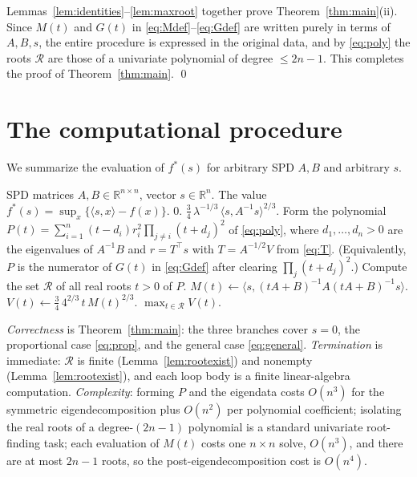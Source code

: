 \documentclass{amsart}
\theoremstyle{definition}
\begin{document}
Lemmas~\ref{lem:identities}--\ref{lem:maxroot} together prove Theorem~\ref{thm:main}(ii). Since $M(t)$ and $G(t)$ in \eqref{eq:Mdef}--\eqref{eq:Gdef} are written purely in terms of $A,B,s$, the entire procedure is expressed in the original data, and by \eqref{eq:poly} the roots $\mathcal R$ are those of a univariate polynomial of degree $\le 2n-1$. This completes the proof of Theorem~\ref{thm:main}. \qed

\section{The computational procedure}\label{sec:algorithm}

We summarize the evaluation of $f^*(s)$ for arbitrary SPD $A,B$ and arbitrary $s$.

\begin{algorithm}[h]
\caption{Evaluation of $f^*(s)$ for $f(x)=q_A(x)q_B(x)$}
\begin{algorithmic}[1]
\Require SPD matrices $A,B\in\mathbb{R}^{n\times n}$, vector $s\in\mathbb{R}^n$.
\Ensure The value $f^*(s)=\sup_x\{\langle s,x\rangle-f(x)\}$.
  \State \Return $0$.
\EndIf
{}
  \State \Return $\tfrac34\,\lambda^{-1/3}\,\langle s,A^{-1}s\rangle^{2/3}$.
\EndIf
\State Form the polynomial $P(t)=\sum_{i=1}^n (t-d_i)r_i^2\prod_{j\ne i}(t+d_j)^2$ of \eqref{eq:poly},
       where $d_1,\dots,d_n>0$ are the eigenvalues of $A^{-1}B$ and $r=T^\top s$ with $T=A^{-1/2}V$
       from \eqref{eq:T}. (Equivalently, $P$ is the numerator of $G(t)$ in \eqref{eq:Gdef} after clearing $\prod_j(t+d_j)^2$.)
\State Compute the set $\mathcal R$ of all real roots $t>0$ of $P$.
  \State $M(t)\gets \langle s,(tA+B)^{-1}A(tA+B)^{-1}s\rangle$.
  \State $V(t)\gets \tfrac34\,4^{2/3}\,t\,M(t)^{2/3}$.
\EndFor
\State \Return $\max_{t\in\mathcal R}V(t)$.
\end{algorithmic}
\end{algorithm}

\noindent\emph{Correctness} is Theorem~\ref{thm:main}: the three branches cover $s=0$, the proportional case \eqref{eq:prop}, and the general case \eqref{eq:general}. \emph{Termination} is immediate: $\mathcal R$ is finite (Lemma~\ref{lem:rootexist}) and nonempty (Lemma~\ref{lem:rootexist}), and each loop body is a finite linear-algebra computation. \emph{Complexity}: forming $P$ and the eigendata costs $O(n^3)$ for the symmetric eigendecomposition plus $O(n^2)$ per polynomial coefficient; isolating the real roots of a degree-$(2n-1)$ polynomial is a standard univariate root-finding task; each evaluation of $M(t)$ costs one $n\times n$ solve, $O(n^3)$, and there are at most $2n-1$ roots, so the post-eigendecomposition cost is $O(n^4)$.
\end{document}

